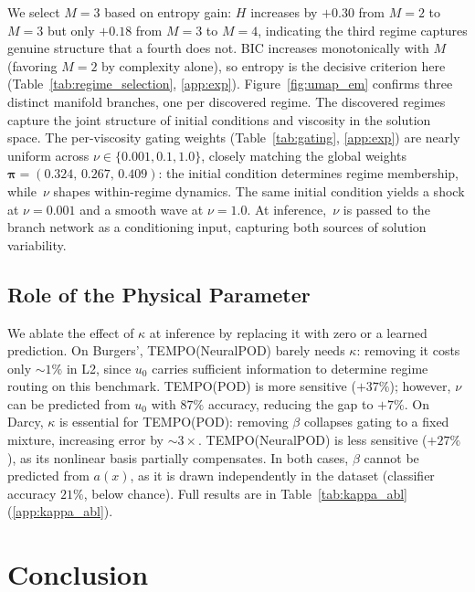 \documentclass[preprint,10pt]{elsarticle}
\begin{document}
We select $M{=}3$ based on entropy gain: $H$ increases by $+0.30$
from $M{=}2$ to $M{=}3$ but only $+0.18$ from $M{=}3$ to $M{=}4$,
indicating the third regime captures genuine structure that a fourth does not.
BIC increases monotonically with $M$ (favoring $M{=}2$ by complexity alone),
so entropy is the decisive criterion here
(Table~\ref{tab:regime_selection}, \ref{app:exp}).
Figure~\ref{fig:umap_em} confirms three distinct manifold branches, one
per discovered regime.
The discovered regimes capture the joint structure of initial conditions and viscosity in the solution space.
The per-viscosity gating weights
(Table~\ref{tab:gating}, \ref{app:exp}) are nearly uniform across
$\nu\in\{0.001,0.1,1.0\}$, closely matching the global weights
$\boldsymbol{\pi}{=}(0.324,\,0.267,\,0.409)$: the initial condition determines regime membership, while~$\nu$ shapes within-regime dynamics.
The same initial condition yields a shock at $\nu{=}0.001$ and a smooth wave at $\nu{=}1.0$.
At inference,~$\nu$ is passed to the branch network as a conditioning input, capturing both sources of solution variability.

\subsection{Role of the Physical Parameter}\label{sec:kappa_abl}

We ablate the effect of $\kappa$ at inference by replacing it with zero or a learned prediction.
On Burgers', TEMPO(NeuralPOD) barely needs $\kappa$: removing it costs only ${\sim}1\%$ in L2, since $u_0$ carries sufficient information to determine regime routing on this benchmark.
TEMPO(POD) is more sensitive ($+37\%$); however, $\nu$ can be predicted from $u_0$ with $87\%$ accuracy, reducing the gap to $+7\%$.
On Darcy, $\kappa$ is essential for TEMPO(POD): removing $\beta$ collapses gating to a fixed mixture, increasing error by ${\sim}3\times$.
TEMPO(NeuralPOD) is less sensitive ($+27\%$), as its nonlinear basis partially compensates.
In both cases, $\beta$ cannot be predicted from $a(x)$, as it is drawn independently in the dataset (classifier accuracy $21\%$, below chance).
Full results are in Table~\ref{tab:kappa_abl} (\ref{app:kappa_abl}).


\section{Conclusion}
\end{document}
